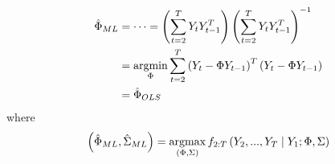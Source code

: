 \documentclass[11pt]{elegantbook}
\newcommand{\argmax}{\operatornamewithlimits{argmax}}
\newcommand{\argmin}{\operatornamewithlimits{argmin}}
\begin{document}
\begin{claim}
    \begin{equation}
        \begin{aligned}
            \hat{\Phi}_{ML}&=\cdots=\left(\sum_{t=2}^T Y_tY_{t-1}^T\right)\left(\sum_{t=2}^T Y_tY_{t-1}^T\right)^{-1}\\
            &=\argmin_{\Phi} \sum_{t=2}^T \left(Y_t-\Phi Y_{t-1}\right)^T\left(Y_t-\Phi Y_{t-1}\right)\\
            &=\hat{\Phi}_{OLS}
        \end{aligned}
        \nonumber
    \end{equation}
    where
\begin{equation}
    \begin{aligned}
        \left(\hat{\Phi}_{ML},\hat{\Sigma}_{ML}\right)=\argmax_{(\Phi,\Sigma)} f_{2:T}\left(Y_2,...,Y_T\mid Y_1;\Phi,\Sigma\right)
    \end{aligned}
    \nonumber
\end{equation}
\end{claim}
\end{document}
